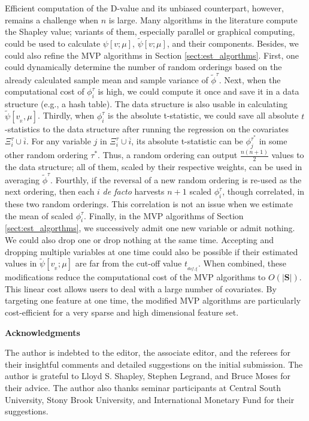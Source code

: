 \documentclass[a4paper,12pt]{article}
\begin{document}
Efficient computation of the D-value and its unbiased counterpart, however, remains a challenge when $n$ is large. 
Many algorithms in the literature compute the Shapley value; variants of them, especially parallel or graphical computing, could be used to calculate $\psi[v;\mu]$, $\tilde \psi[v;\mu]$, and their components.
Besides, we could also refine the MVP algorithms in Section \ref{sect:est_algorthms}. 
First, one could dynamically determine the number of random orderings based on the already calculated sample mean and sample variance of $\tilde \phi^{\tau}$.
Next, when the computational cost of $\phi^\tau_i$ is high, we could compute it once and save it in a data structure (e.g., a hash table).
The data structure is also usable in calculating $\tilde \psi [v_{_\mathbb{R}}, \mu]$.
Thirdly, when $\phi^\tau_i$ is the absolute t-statistic, we could save all absolute $t$-statistics to the data structure after running the regression on the covariates $\Xi^\tau_i \cup \overline{i}$.
For any variable $j$ in $\Xi^\tau_i \cup \overline{i}$, its absolute t-statistic can be $\phi^{\tau^*}_j$ in some other random ordering $\tau^*$.
Thus, a random ordering can output $\frac{n(n+1)}{2}$ values to the data structure; all of them, scaled by their respective weights, can be used in averaging $\tilde \phi^{\tau}$.
Fourthly, if the reversal of a new random ordering is re-used as the next ordering, then each $i$ \textit{de facto} harvests $n+1$ scaled $\phi^\tau_i$, though correlated, in these two random orderings.
This correlation is not an issue when we estimate the mean of scaled $\phi^\tau_i$.
Finally, in the MVP algorithms  of Section \ref{sect:est_algorthms}, we successively admit one new variable or admit nothing. We could also drop one or drop nothing at the same time.
Accepting and dropping multiple variables at one time could also be possible if their estimated values in $\tilde \psi [v_{_\mathbb{R}}; \mu]$ are far from the cut-off value $t_{_{dof,\xi}}$.
When combined, these modifications reduce the computational cost of the MVP algorithms to $O(|\mathbf{S}|)$. This linear cost allows users to deal with a large number of covariates.
By targeting one feature at one time, the modified MVP algorithms are particularly cost-efficient for a very sparse and high dimensional feature set. 



\vskip 1cm
\noindent \textbf{Acknowledgments}

\noindent The author is indebted to the editor, the associate editor, and the referees for their insightful comments and detailed suggestions on the initial submission.
The author is grateful to Lloyd S. Shapley, Stephen Legrand, and Bruce Moses for their advice. 
The author also thanks seminar participants at Central South University, Stony Brook University, and International Monetary Fund for their suggestions.
\end{document}
